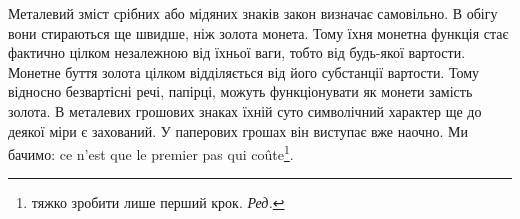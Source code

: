 Металевий зміст срібних або мідяних знаків закон визначає
самовільно. В обігу вони стираються ще швидше, ніж золота
монета. Тому їхня монетна функція стає фактично цілком незалежною
від їхньої ваги, тобто від будь-якої вартости. Монетне
буття золота цілком відділяється від його субстанції вартости.
Тому відносно безвартісні речі, папірці, можуть функціонувати
як монети замість золота. В металевих грошових знаках їхній
суто символічний характер ще до деякої міри є захований. У паперових
грошах він виступає вже наочно. Ми бачимо: ce n’est que
le premier pas qui coûte\footnote*{
тяжко зробити лише перший крок. \emph{Ред.}
}.
